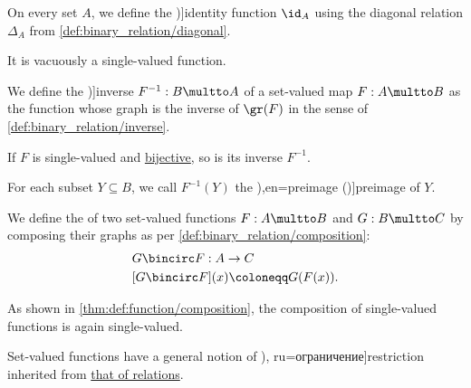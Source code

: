 \begin{definition}
\begin{thmenum}[resume=def:set_valued_function]
     On every set \( A \), we define the \term[ru=тождественная функция (\cite[33]{ШеньВерещагин2020НачалаТеорииМножеств})]{identity function} \( \id_A \) using the diagonal relation \( \Delta_A \) from \cref{def:binary_relation/diagonal}.

    It is vacuously a single-valued function.

     We define the \term[ru=обратное (соответствие) (\cite[\S 1.2.6]{КусраевКутателадзе2005БулевозначныйАнализ})]{inverse} \( F^{-1}: B \multto A \) of a set-valued map \( F: A \multto B \) as the function whose graph is the inverse of \( \gr(F) \) in the sense of \cref{def:binary_relation/inverse}.

    If \( F \) is single-valued and \hyperref[def:functor_invertibility/bijective]{bijective}, so is its inverse \( F^{-1} \).

    For each subset \( Y \subseteq B \), we call \( F^{-1}(Y) \) the \term[ru=прообраз (\cite[33]{ШеньВерещагин2020НачалаТеорииМножеств}),en=preimage (\cite[def. 1.16]{Rudin1991FunctionalAnalysis})]{preimage} of \( Y \).

     We define the  of two set-valued functions \( F: A \multto B \) and \( G: B \multto C \) by composing their graphs as per \cref{def:binary_relation/composition}:
    \begin{equation*}
      \begin{aligned}
        &G \bincirc F: A \to C \\
        &[G \bincirc F](x) \coloneqq G(F(x)).
      \end{aligned}
    \end{equation*}

    As shown in \cref{thm:def:function/composition}, the composition of single-valued functions is again single-valued.

     Set-valued functions have a general notion of \term[en=restriction (\cite[34]{AubinFrankowska1990SetValuedAnalysis}), ru=ограничение]{restriction} inherited from \hyperref[def:relation/restriction]{that of relations}.


\end{thmenum}
\end{definition}
